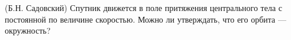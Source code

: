 (Б.Н. Садовский)
Спутник движется в поле притяжения центрального тела  с постоянной по
величине скоростью. Можно ли утверждать, что его орбита --- окружность?
